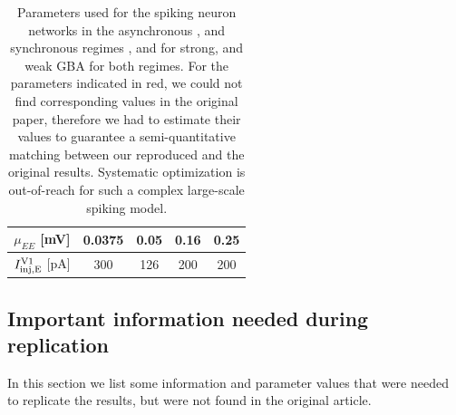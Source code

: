 \begin{table}[!ht]
\begin{tabular}{c|c|c|c|c|}
\multicolumn{1}{|c|}{$\mu_{EE}$ {[}mV{]}}                & 0.0375              & 0.05                 & 0.16               & 0.25                 \\ \hline
\multicolumn{1}{|c|}{$I_{\rm inj, E}^{\rm V1}$ {[}pA{]}} & 300                 & 126                  & 200                & 200                  \\ \hline
\end{tabular}
\caption{Parameters used for the spiking neuron networks in the asynchronous , and synchronous regimes , and for strong, and weak GBA for both regimes. For the parameters indicated in red, we could not find corresponding values in the original paper, therefore we had to estimate their values to guarantee a semi-quantitative matching between our reproduced and the original results. Systematic optimization is out-of-reach for such a complex large-scale spiking model.}\label{tab:par_spike}
\end{table}

\subsection{Important information needed during replication}
\label{important_info}

In this section we list some information and parameter values that were needed to replicate the results, but were not found in the original article.

